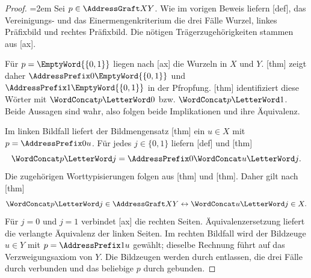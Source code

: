 \begin{proof}
\emergencystretch=2em
Sei \(p\in\AddressGraft X Y\). Wie im vorigen Beweis liefern
[def], das Vereinigungs- und
das Einermengenkriterium die drei Fälle Wurzel, linkes Präfixbild und
rechtes Präfixbild. Die nötigen Trägerzugehörigkeiten stammen aus
[ax].

Für \(p=\EmptyWord{\{0,1\}}\) liegen nach
[ax] die Wurzeln in
\(X\) und \(Y\). [thm]
zeigt daher \(\AddressPrefix0{\EmptyWord{\{0,1\}}}\) und
\(\AddressPrefix1{\EmptyWord{\{0,1\}}}\) in der Pfropfung.
[thm] identifiziert diese
Wörter mit \(\WordConcat p{\LetterWord0}\) bzw.
\(\WordConcat p{\LetterWord1}\). Beide Aussagen sind wahr, also
folgen beide Implikationen und ihre Äquivalenz.

Im linken Bildfall liefert der Bildmengensatz
[thm]
ein \(u\in X\) mit \(p=\AddressPrefix0u\). Für jedes
\(j\in\{0,1\}\) liefern [def]
und [thm]
\[
 \WordConcat p{\LetterWord j}
 =\AddressPrefix0{\WordConcat u{\LetterWord j}}.
\]
Die zugehörigen Worttypisierungen folgen aus
[thm] und
[thm]. Daher gilt nach
[thm]
\[
 \WordConcat p{\LetterWord j}\in\AddressGraft X Y
 \leftrightarrow\WordConcat u{\LetterWord j}\in X.
\]
Für \(j=0\) und \(j=1\) verbindet
[ax] die rechten
Seiten. Äquivalenzersetzung \rLRS{} liefert die verlangte
Äquivalenz der linken Seiten. Im rechten Bildfall wird der Bildzeuge
\(u\in Y\) mit \(p=\AddressPrefix1u\) gewählt; dieselbe Rechnung
führt auf das Verzweigungsaxiom von \(Y\).
Die Bildzeugen werden durch \rEE{} entlassen, die drei Fälle durch
\rOE{} verbunden und das beliebige \(p\) durch \rUI{} gebunden.
\end{proof}
